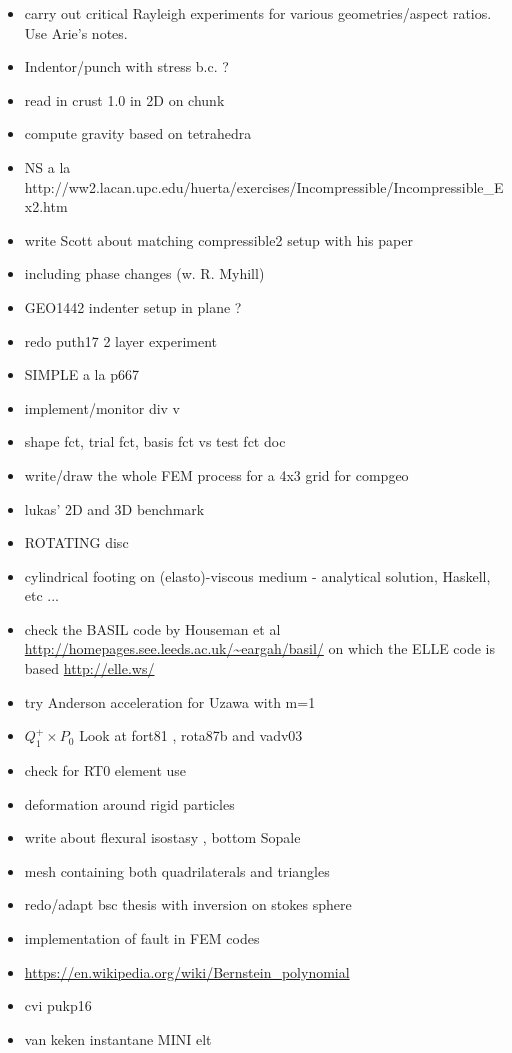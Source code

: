\begin{itemize}
\item carry out critical Rayleigh experiments for various geometries/aspect ratios. Use Arie's notes. 
\item Indentor/punch with stress b.c. ?
\item read in crust 1.0 in 2D on chunk
\item compute gravity based on tetrahedra
\item NS a la http://ww2.lacan.upc.edu/huerta/exercises/Incompressible/Incompressible\_Ex2.htm
\item write Scott about matching compressible2 setup with his paper
\item including phase changes (w. R. Myhill)
\item GEO1442 indenter setup in plane ?
\item redo puth17 2 layer experiment
\item SIMPLE a la p667 \cite{john16} 
\item implement/monitor div v
\item shape fct, trial fct, basis fct vs test fct doc
\item write/draw the whole FEM process for a 4x3 grid for compgeo
\item lukas' 2D and 3D benchmark
\item ROTATING disc
\item cylindrical footing on (elasto)-viscous medium - analytical solution, Haskell, etc ...
\item check the BASIL code by Houseman et al \url{http://homepages.see.leeds.ac.uk/~eargah/basil/}
on which the ELLE code is based \url{http://elle.ws/} 
\item try Anderson acceleration for Uzawa \cite{hoow17} with m=1
\item $Q_1^+ \times P_0$ Look at fort81 , rota87b and vadv03
\item check \cite{bufm19} for RT0 element use
\item deformation around rigid particles \cite{ilma93}
\item write about flexural isostasy \cite{maie12}, bottom Sopale
\item mesh containing both quadrilaterals and triangles \cite{anbr80}
\item redo/adapt bsc thesis with inversion on stokes sphere
\item implementation of fault in FEM codes \cite{zhgu94,zhgu95}
\item \url{https://en.wikipedia.org/wiki/Bernstein_polynomial}
\item cvi pukp16
\item van keken instantane MINI elt
\end{itemize}

